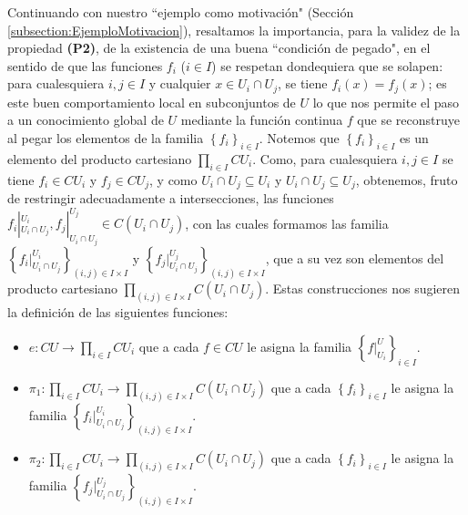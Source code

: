 Continuando con nuestro ``ejemplo como motivación" (Sección \ref{subsection:EjemploMotivacion}), resaltamos la importancia, para la validez de la propiedad \textbf{(P2)}, de la existencia de una buena ``condición de pegado", en el sentido de que las funciones $f_i$ ($i\in I$) se respetan dondequiera que se solapen: para cualesquiera $i,j\in I$ y cualquier $x\in U_i\cap U_j$, se tiene $f_i(x)=f_j(x)$; es este buen comportamiento local en subconjuntos de $U$ lo que nos permite el paso a un conocimiento global de $U$ mediante la función continua $f$ que se reconstruye al pegar los elementos de la familia $\left\lbrace f_i\right\rbrace_{i\in I}$. Notemos que $\left\lbrace f_i\right\rbrace_{i\in I}$ es un elemento del producto cartesiano $\prod_{i\in I} CU_i$. Como, para cualesquiera $i,j\in I$ se tiene $f_i\in CU_i$ y $f_j\in CU_j$, y como $U_i\cap U_j\subseteq U_i$ y $U_i\cap U_j\subseteq U_j$, obtenemos, fruto de restringir adecuadamente a intersecciones, las funciones ${f_i}|^{U_i}_{U_i\cap U_j}, {f_j}|^{U_j}_{U_i\cap U_j}\in C(U_i\cap U_j)$, con las cuales formamos las familia $\left\lbrace {f_i}|^{U_i}_{U_i\cap U_j}\right\rbrace_{(i,j)\in I\times I}$ y $\left\lbrace {f_j}|^{U_j}_{U_i\cap U_j}\right\rbrace_{(i,j)\in I\times I}$, que a su vez son elementos del producto cartesiano $\prod_{(i,j)\in I\times I}C(U_i\cap U_j)$. Estas construcciones nos sugieren la definición de las siguientes funciones:
\begin{itemize}
   \item $e:CU\to \prod_{i\in I}CU_i$ que a cada $f\in CU$ le asigna la familia $\left\lbrace f|^{U}_{U_i}\right\rbrace_{i\in I}$.
   \item $\pi_1:\prod_{i\in I}CU_i\to \prod_{(i,j)\in I\times I}C(U_i\cap U_j)$ que a cada $\left\lbrace f_i\right\rbrace_{i\in I}$ le asigna la familia $\left\lbrace {f_i}|^{U_i}_{U_i\cap U_j}\right\rbrace_{(i,j)\in I\times I}$.
   \item $\pi_2:\prod_{i\in I}CU_i\to \prod_{(i,j)\in I\times I}C(U_i\cap U_j)$ que a cada $\left\lbrace f_i\right\rbrace_{i\in I}$ le asigna la familia $\left\lbrace {f_j}|^{U_j}_{U_i\cap U_j}\right\rbrace_{(i,j)\in I\times I}$.
\end{itemize}
